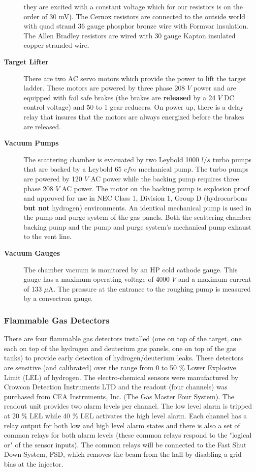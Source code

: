 \begin{safetyen}{10}{5}
\begin{description}
they are excited with a constant voltage which for our resistors is
on the order of 30 mV). The Cernox resistors are connected to the outside world
with quad strand 36 gauge phosphor bronze wire with Formvar insulation.
The Allen Bradley resistors are wired with 30 gauge Kapton insulated 
copper stranded wire.
\item[{\bf Target Lifter}] There are two AC servo motors which provide
the power to lift the target ladder. These motors are powered by three
phase 208 $V$ power and are equipped with fail safe brakes (the brakes are
{\bf released} by a 24 $V$ DC control voltage)
and 50 to 1 gear reducers. On power up, there is a delay relay
that insures that
the motors are always energized before the brakes are released.
\item[{\bf Vacuum Pumps}] The scattering chamber is evacuated by two Leybold
1000 $l/s$ turbo pumps that are  backed by a Leybold 65 $cfm$
mechanical pump. The turbo pumps are powered by 120 $V$ AC power while the
backing pump requires three phase 208 $V$ AC power. The motor on the backing 
pump is explosion proof and approved for use in NEC Class 1, Division 1,
Group D (hydrocarbons {\bf but not} hydrogen) environments. An identical
mechanical pump is used in the pump and purge system of the gas panels.
Both the scattering chamber backing pump and the
pump and purge system's mechanical pump exhaust to the vent line. 
\item[{\bf Vacuum Gauges}] The chamber vacuum is monitored by an
HP cold cathode gauge. This gauge has a maximum operating voltage of 
4000 $V$ and a maximum
current of 133 $\mu$A. The pressure at the entrance to the roughing pump
is measured by a convectron gauge.
\end{description}

\subsubsection{ Flammable Gas Detectors}

There are four flammable gas detectors installed (one on top of the target,
one each on top of the hydrogen and deuterium gas panels, one on top of the gas
tanks)
to provide early detection
of hydrogen/deuterium leaks. These detectors are sensitive (and calibrated)
over the range from 0 to 50 $\%$ Lower Explosive Limit (LEL) of hydrogen.
The electro-chemical sensors were manufactured by Crowcon Detection
Instruments LTD and
the readout (four channels) was purchased from CEA Instruments, Inc. 
(The Gas Master Four System). The readout unit provides two alarm
levels per channel. The low level alarm is tripped at 20 $\%$ LEL
while 40 $\%$ LEL activates the high level alarm.
Each channel has a relay output for both low and high level alarm
states and there is also a set of common relays for both alarm
levels (these common relays respond to the "logical or" of the sensor inputs).
The common relays will be connected to the Fast Shut Down System, FSD,
which removes the beam from the hall by disabling a grid bias at the
injector.
\end{safetyen}

